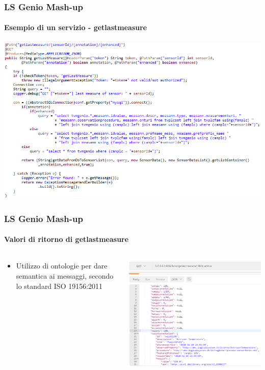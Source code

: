 \documentclass{beamer}
\begin{document}
\begin{frame}
\frametitle{LS Genio Mash-up}
\framesubtitle{Esempio di un servizio - getlastmeasure}
\includegraphics[width=1\textwidth]{images/getlastmeasure.png}
\end{frame}

\begin{frame}
\frametitle{LS Genio Mash-up}
\framesubtitle{Valori di ritorno di getlastmeasure}
\begin{columns}[T] %
\begin{column}{.38\textwidth}
	\begin{itemize}
		\small
		\item Utilizzo di ontologie per dare semantica ai messaggi, secondo lo standard ISO 19156:2011
	\end{itemize}
	
\end{column}%
\hfill%
\begin{column}{.58\textwidth}
	\includegraphics[width=1\textwidth]{images/Postman1-corretto.png}
\end{column}%
\end{columns}

\end{frame}
\end{document}
